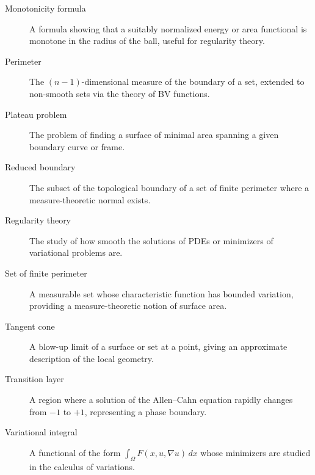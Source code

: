 \begin{description}
    \item[Monotonicity formula] A formula showing that a suitably normalized energy or area functional is monotone in the radius of the ball, useful for regularity theory.
    \item[Perimeter] The \((n-1)\)-dimensional measure of the boundary of a set, extended to non-smooth sets via the theory of BV functions.
    \item[Plateau problem] The problem of finding a surface of minimal area spanning a given boundary curve or frame.
    \item[Reduced boundary] The subset of the topological boundary of a set of finite perimeter where a measure-theoretic normal exists.
    \item[Regularity theory] The study of how smooth the solutions of PDEs or minimizers of variational problems are.
    \item[Set of finite perimeter] A measurable set whose characteristic function has bounded variation, providing a measure-theoretic notion of surface area.
    \item[Tangent cone] A blow-up limit of a surface or set at a point, giving an approximate description of the local geometry.
    \item[Transition layer] A region where a solution of the Allen--Cahn equation rapidly changes from \(-1\) to \(+1\), representing a phase boundary.
    \item[Variational integral] A functional of the form \(\int_\Omega F(x,u,\nabla u)\,dx\) whose minimizers are studied in the calculus of variations.
\end{description}

